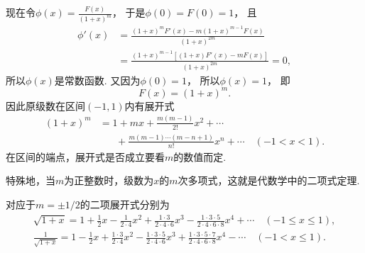 \begin{example}
\begin{solution}
现在令\(\phi(x) = \frac{F(x)}{(1+x)^m}\)，
于是\(\phi(0) = F(0) = 1\)，
且\begin{align*}
	\phi'(x)
	&= \frac{(1+x)^m F'(x) - m(1+x)^{m-1} F(x)}{(1+x)^{2m}} \\
	&= \frac{(1+x)^{m-1} [(1+x) F'(x) - m F(x)]}{(1+x)^{2m}}
	= 0,
\end{align*}
所以\(\phi(x)\)是常数函数.
又因为\(\phi(0) = 1\)，
所以\(\phi(x) = 1\)，
即\[
	F(x) = (1+x)^m.
\]
因此原级数在区间\((-1,1)\)内有展开式
\begin{equation}\label{equation:无穷级数.二项展开式}
\begin{split}
	(1+x)^m
	&= 1+mx+\frac{m(m-1)}{2!}x^2+\dotsb \\
	&\hspace{20pt} +\frac{m(m-1)\dotsm(m-n+1)}{n!}x^n+\dotsb
	\quad(-1<x<1).
\end{split}
\end{equation}
在区间的端点，展开式是否成立要看\(m\)的数值而定.
\end{solution}
\end{example}

特殊地，当\(m\)为正整数时，级数为\(x\)的\(m\)次多项式，这就是代数学中的二项式定理.

对应于\(m=\pm1/2\)的二项展开式分别为\begin{gather*}
	\sqrt{1+x}
	= 1+\frac{1}{2}x-\frac{1}{2\cdot4}x^2+\frac{1\cdot3}{2\cdot4\cdot6}x^3-\frac{1\cdot3\cdot5}{2\cdot4\cdot6\cdot8}x^4+\dotsb
	\quad(-1 \leq x \leq 1), \\
	\frac{1}{\sqrt{1+x}}
	= 1-\frac{1}{2}x+\frac{1\cdot3}{2\cdot4}x^2-\frac{1\cdot3\cdot5}{2\cdot4\cdot6}x^3+\frac{1\cdot3\cdot5\cdot7}{2\cdot4\cdot6\cdot8}x^4-\dotsb
	\quad(-1 < x \leq 1).
\end{gather*}

